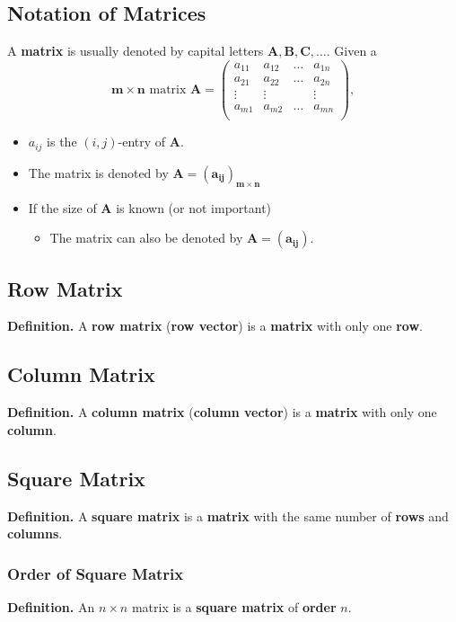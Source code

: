 \documentclass[../ma2001_notes.tex]{subfiles}
\begin{document}
\subsection{Notation of Matrices}
A \textbf{matrix} is usually denoted by capital letters \(\bm{A},\bm{B},\bm{C},\ldots\). Given a
\[\bm{m\times n}\text{ matrix }\bm{A}=
\left(\begin{array}{cccc}
a_{11} & a_{12} & \ldots & a_{1n} \\ 
a_{21} & a_{22} & \ldots & a_{2n} \\ 
\vdots & \vdots & & \vdots \\ 
a_{m1} & a_{m2} & \ldots & a_{mn} \\
\end{array}\right),\]
\begin{itemize}
	\item \(a_{ij}\) is the \((i,j)\)-entry of \(\bm{A}\).
	\item The matrix is denoted by \(\bm{A=(a_{ij})_{m\times n}}\)
	\item If the size of \(\bm{A}\) is known (or not important)
	\begin{itemize}
		\item The matrix can also be denoted by \(\bm{A=(a_{ij})}\).
	\end{itemize}
\end{itemize}

\subsection{Row Matrix}
\textbf{Definition.} A \textbf{row matrix} (\textbf{row vector}) is a \textbf{matrix} with only one \textbf{row}.

\subsection{Column Matrix}
\textbf{Definition.} A \textbf{column matrix} (\textbf{column vector}) is a \textbf{matrix} with only one \textbf{column}.

\subsection{Square Matrix}
\textbf{Definition.} A \textbf{square matrix} is a \textbf{matrix} with the same number of \textbf{rows} and \textbf{columns}.

\subsubsection{Order of Square Matrix}
\textbf{Definition.} An \(n\times n\) matrix is a \textbf{square matrix} of \textbf{order} \(n\).
\end{document}
